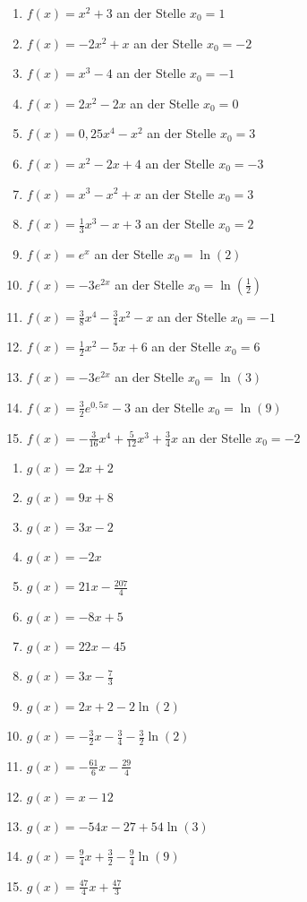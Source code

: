 \begin{Exercise}[title={\raggedright Bestimme jeweils die Tangentengleichung.}, label=tangentenBestimmenA1]
	\begin{enumerate}[label=\alph*)]
		\item \(f(x)=x^2+3\) an der Stelle \(x_0=1\)
		\item \(f(x)=-2x^2+x\) an der Stelle \(x_0=-2\)
		\item \(f(x)=x^3-4\) an der Stelle \(x_0=-1\)
		\item \(f(x)=2x^2-2x\) an der Stelle \(x_0=0\)
		\item \(f(x)=0,25x^4-x^2\) an der Stelle \(x_0=3\)
		\item \(f(x)=x^2-2x+4\) an der Stelle \(x_0=-3\)
		\item \(f(x)=x^3-x^2+x\) an der Stelle \(x_0=3\)
		\item \(f(x)=\frac{1}{3}x^3-x+3\) an der Stelle \(x_0=2\)
		\item \(f(x)=e^x\) an der Stelle \(x_0=\ln(2)\)
		\item \(f(x)=-3e^{2x}\) an der Stelle \(x_0=\ln\left(\frac{1}{2}\right)\)
		\item \(f(x)=\frac{3}{8}x^4-\frac{3}{4}x^2-x\) an der Stelle \(x_0=-1\)
		\item \(f(x)=\frac{1}{2}x^2-5x+6\) an der Stelle \(x_0=6\)
		\item \(f(x)=-3e^{2x}\) an der Stelle \(x_0=\ln(3)\)
		\item \(f(x)=\frac{3}{2}e^{0,5x}-3\) an der Stelle \(x_0=\ln(9)\)
		\item \(f(x)=-\frac{3}{16}x^4+\frac{5}{12}x^3+\frac{3}{4}x\) an der Stelle \(x_0=-2\)
	\end{enumerate}
\end{Exercise}
\begin{Answer}[ref=tangentenBestimmenA1]
	\begin{enumerate}[label=\alph*)]
		\item \(g(x)=2x+2\)
		\item \(g(x)=9x+8\)
		\item \(g(x)=3x-2\)
		\item \(g(x)=-2x\)
		\item \(g(x)=21x-\frac{207}{4}\)
		\item \(g(x)=-8x+5\)
		\item \(g(x)=22x-45\)
		\item \(g(x)=3x-\frac{7}{3}\)
		\item \(g(x)=2x+2-2\ln(2)\)
		\item \(g(x)=-\frac{3}{2}x-\frac{3}{4}-\frac{3}{2}\ln(2)\)
		\item \(g(x)=-\frac{61}{6}x-\frac{29}{4}\)
		\item \(g(x)=x-12\)
		\item \(g(x)=-54x-27+54\ln(3)\)
		\item \(g(x)=\frac{9}{4}x+\frac{3}{2}-\frac{9}{4}\ln(9)\)
		\item \(g(x)=\frac{47}{4}x+\frac{47}{3}\)
	\end{enumerate}
\end{Answer}